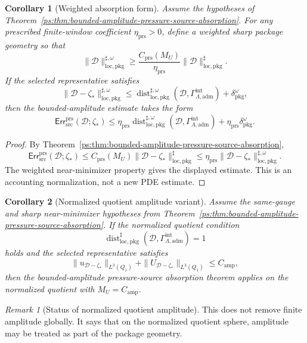 \documentclass[11pt]{article}
\numberwithin{equation}{section}
\newtheorem{corollary}[corollary]{Corollary}
\theoremstyle{definition}
\theoremstyle{remark}
\newtheorem{remark}[remark]{Remark}
\newcommand{\loc}{\mathrm{loc}}
\newcommand{\pkg}{\mathrm{pkg}}
\newcommand{\adm}{\mathrm{adm}}
\newcommand{\prs}{\mathrm{prs}}
\newcommand{\src}{\mathrm{src}}
\newcommand{\Err}{\mathsf{Err}}
\newcommand{\Dist}{\operatorname{dist}}
\newcommand{\calD}{\mathcal D}
\newcommand{\Qone}{Q_1}
\newcommand{\Gadm}{\Gamma^{\mathrm{int}}_{\Lambda,\adm}}
\begin{document}
\begin{corollary}[Weighted absorption form]
\label{ps:thm:weighted-absorption-target}
Assume the hypotheses of
Theorem~\ref{ps:thm:bounded-amplitude-pressure-source-absorption}.  For any prescribed
finite-window coefficient \(\eta_{\prs}>0\), define a weighted sharp package
geometry so that
\[
    \|\calD\|_{\loc,\pkg}^{\sharp,\omega}
    \ge
    \frac{C_{\prs}(M_U)}{\eta_{\prs}}
    \|\calD\|_{\loc,\pkg}^{\sharp}.
\]
If the selected representative satisfies
\[
    \|\calD-\zeta_*\|_{\loc,\pkg}^{\sharp,\omega}
    \le
    \Dist_{\loc,\pkg}^{\sharp,\omega}(\calD,\Gadm)
    +
    \delta_{\pkg}^{\omega},
\]
then the bounded-amplitude estimate takes the
form
\[
    \Err^{\prs}_{\src}(\calD;\zeta_*)
    \le
    \eta_{\prs}
    \Dist_{\loc,\pkg}^{\sharp,\omega}(\calD,\Gadm)
    +
    \eta_{\prs}\delta_{\pkg}^{\omega}.
\]
\end{corollary}

\begin{proof}
By Theorem~\ref{ps:thm:bounded-amplitude-pressure-source-absorption},
\[
    \Err^{\prs}_{\src}(\calD;\zeta_*)
    \le
    C_{\prs}(M_U)\|\calD-\zeta_*\|_{\loc,\pkg}^{\sharp}
    \le
    \eta_{\prs}\|\calD-\zeta_*\|_{\loc,\pkg}^{\sharp,\omega}.
\]
The weighted near-minimizer property gives the displayed estimate.  This is an
accounting normalization, not a new PDE estimate.
\end{proof}

\begin{corollary}[Normalized quotient amplitude variant]
\label{ps:thm:normalized-quotient-amplitude-target}
Assume the same-gauge and sharp near-minimizer hypotheses from
Theorem~\ref{ps:thm:bounded-amplitude-pressure-source-absorption}.  If the normalized
quotient condition
\[
    \Dist_{\loc,\pkg}^{\sharp}(\calD,\Gadm)=1
\]
holds and the selected representative satisfies
\[
    \|u_{\calD-\zeta_*}\|_{L^3(\Qone)}
    +
    \|U_{\calD-\zeta_*}\|_{L^3(\Qone)}
    \le
    C_{\mathrm{amp}},
\]
then the bounded-amplitude pressure-source absorption theorem applies on the
normalized quotient with \(M_U=C_{\mathrm{amp}}\).
\end{corollary}

\begin{remark}[Status of normalized quotient amplitude]
This does not remove finite amplitude globally.  It says that on the
normalized quotient sphere, amplitude may be treated as part of the package
geometry.
\end{remark}
\end{document}
